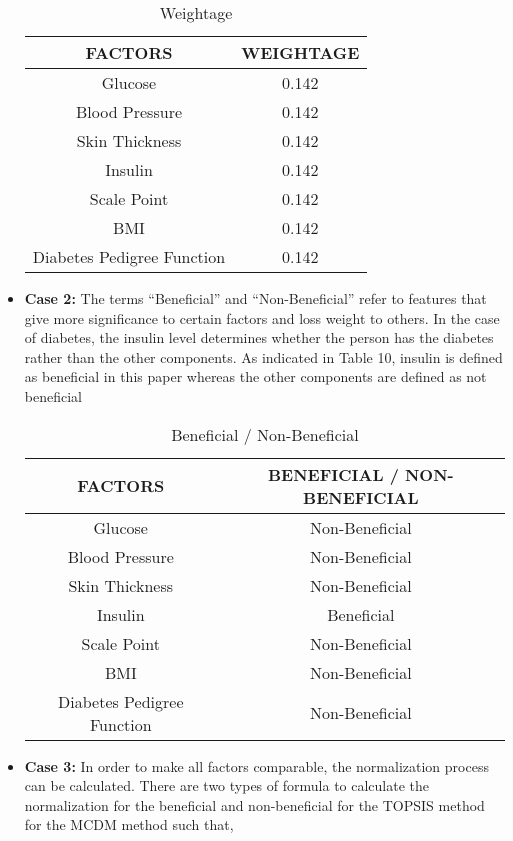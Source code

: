 \documentclass[12pt,a4paper]{article}
\begin{document}
\begin{itemize}
\begin{table}[h!]
\centering
\begin{tabular}{|c|c|}
\hline
\textbf{FACTORS} & \textbf{WEIGHTAGE} \\
\hline
Glucose & 0.142 \\
\hline
Blood Pressure & 0.142 \\
\hline
Skin Thickness & 0.142 \\
\hline
Insulin & 0.142 \\
\hline
Scale Point & 0.142 \\
\hline
BMI & 0.142 \\
\hline
Diabetes Pedigree Function & 0.142 \\
\hline
\end{tabular}
\caption{Weightage}
\end{table}

\item \textbf{Case 2:} The terms “Beneficial” and “Non-Beneficial” refer to features that give more significance to certain factors and loss weight to others. In the case of diabetes, the insulin level determines whether the person has the diabetes rather than the other components. As indicated in Table 10, insulin is defined as beneficial in this paper whereas the other components are defined as not beneficial

\begin{table}[h!]
\centering
\begin{tabular}{|c|c|}
\hline
\textbf{FACTORS} & \textbf{BENEFICIAL / NON-BENEFICIAL} \\
\hline
Glucose & Non-Beneficial \\
\hline
Blood Pressure & Non-Beneficial \\
\hline
Skin Thickness & Non-Beneficial \\
\hline
Insulin & Beneficial \\
\hline
Scale Point & Non-Beneficial \\
\hline
BMI & Non-Beneficial \\
\hline
Diabetes Pedigree Function & Non-Beneficial \\
\hline
\end{tabular}
\caption{Beneficial / Non-Beneficial}
\end{table}

\item \textbf{Case 3:} In order to make all factors comparable, the normalization process can be calculated. There are two types of formula to calculate the normalization for the beneficial and non-beneficial for the TOPSIS method for the MCDM method such that,


\end{itemize}
\end{document}
